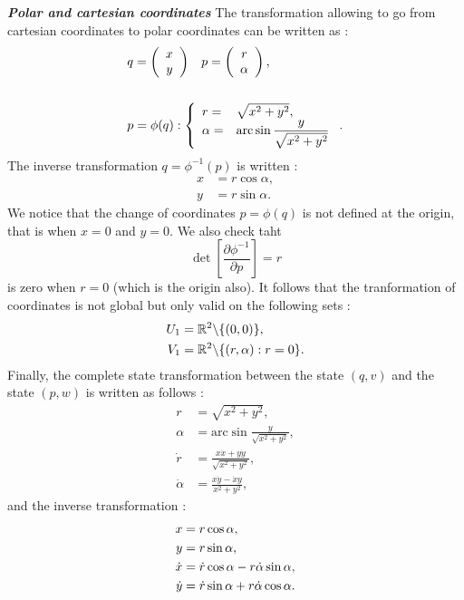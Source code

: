 \begin{exemple}{\bf \em Polar and cartesian coordinates}
The transformation allowing to go from cartesian coordinates to polar coordinates can be written as :
\begin{equation*} \begin{split}
&q = \bma{c} x \\y \ema \;\;\; p = \bma{c} r\\ \alpha \ema,\\
& \vm \\
&p = \phi(q) : \left\{ \begin{array}{ll}
r =&\sqrt{x^2 + y^2},\\ 
\alpha  =&\mbox{arc} \sin \dfrac{y}{\sqrt{x^2 + y^2}} 
\end{array}
\right..
\end{split} \end{equation*} 
The inverse transformation $q = \phi^{-1} (p) $ is written :
\begin{equation*} \begin{split}
x &= r \cos \alpha,\\
y &= r \sin \alpha.
\end{split} \end{equation*}
We notice that the change of coordinates $p = \phi(q)$ is not defined at the origin, that is when $x=0$ and $y=0$.  We also check taht
$$ \det[\frac{\partial \phi^{-1}}{\partial p} ] = r
$$
is zero when $r=0$ (which is the origin also). It follows that the tranformation of coordinates is not global but only valid on the following sets :
\begin{equation*} \begin{split}
U_1 &=\mathbb{R}^2 \backslash \{(0,0)\},\\
V_1 &= \mathbb{R}^2 \backslash \{(r, \alpha) : r = 0\}.
\end{split} \end{equation*}
Finally, the complete state transformation between the state 
$(q,v)$ and the state $(p,w)$ is written as follows :
\begin{equation*} \begin{split}
r&= \sqrt{x^2 +y^2},\\
\alpha &= \mbox{arc} \sin \frac{y}{\sqrt{x^2 +y^2}},\\
\dot r &= \frac{x \dot x + y \dot y}{\sqrt{x^2 +y^2}},\\
\dot \alpha &= \frac{x \dot y - \dot x y}{x^2 + y^2},
\end{split} \end{equation*}
and the inverse transformation :
\begin{equation*} \begin{split}
x&= r \cos \alpha,\\
y &= r \sin \alpha,\\
\dot x &= \dot r \cos \alpha - r \dot \alpha \sin \alpha,\\
\dot y &= \dot r \sin \alpha + r \dot \alpha \cos \alpha. \xqedhere{4.6cm}{\qed}
\end{split} \end{equation*}
\end{exemple}

